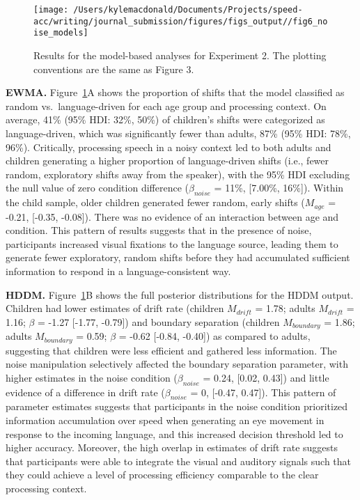 \documentclass[,man,floatsintext]{apa6}
\begin{document}
\begin{figure}[!ht]

{\centering \texttt{[image: /Users/kylemacdonald/Documents/Projects/speed-acc/writing/journal\_submission/figures/figs\_output//fig6\_noise\_models]} 

}

\caption{Results for the model-based analyses for Experiment 2. The plotting conventions are the same as Figure 3.}\label{fig:noise-model-plots}
\end{figure}

\textbf{EWMA.} Figure~\ref{fig:noise-model-plots}A shows the proportion of shifts that the model classified as random vs.~language-driven for each age group and processing context. On average, 41\% (95\% HDI: 32\%, 50\%) of children's shifts were categorized as language-driven, which was significantly fewer than adults, 87\% (95\% HDI: 78\%, 96\%). Critically, processing speech in a noisy context led to both adults and children generating a higher proportion of language-driven shifts (i.e., fewer random, exploratory shifts away from the speaker), with the 95\% HDI excluding the null value of zero condition difference (\(\beta_{noise}\) = 11\%, {[}7.00\%, 16\%{]}). Within the child sample, older children generated fewer random, early shifts (\(M_{age}\) = -0.21, {[}-0.35, -0.08{]}). There was no evidence of an interaction between age and condition. This pattern of results suggests that in the presence of noise, participants increased visual fixations to the language source, leading them to generate fewer exploratory, random shifts before they had accumulated sufficient information to respond in a language-consistent way.

\textbf{HDDM.} Figure~\ref{fig:noise-model-plots}B shows the full posterior distributions for the HDDM output. Children had lower estimates of drift rate (children \(M_{drift}\) = 1.78; adults \(M_{drift}\) = 1.16; \(\beta\) = -1.27 {[}-1.77, -0.79{]}) and boundary separation (children \(M_{boundary}\) = 1.86; adults \(M_{boundary}\) = 0.59; \(\beta\) = -0.62 {[}-0.84, -0.40{]}) as compared to adults, suggesting that children were less efficient and gathered less information. The noise manipulation selectively affected the boundary separation parameter, with higher estimates in the noise condition (\(\beta_{noise}\) = 0.24, {[}0.02, 0.43{]}) and little evidence of a difference in drift rate (\(\beta_{noise}\) = 0, {[}-0.47, 0.47{]}). This pattern of parameter estimates suggests that participants in the noise condition prioritized information accumulation over speed when generating an eye movement in response to the incoming language, and this increased decision threshold led to higher accuracy. Moreover, the high overlap in estimates of drift rate suggests that participants were able to integrate the visual and auditory signals such that they could achieve a level of processing efficiency comparable to the clear processing context.
\end{document}
